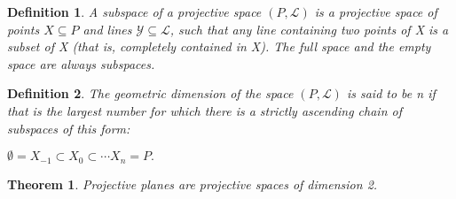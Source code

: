 \documentclass[12pt]{article}
\newtheorem{theorem}{Theorem}
\newtheorem{definition}{Definition}
\begin{document}
    \begin{definition}
        A subspace of a projective space $(P, \mathcal{L})$ is a projective space of points $X \subseteq P$ and lines $\mathcal{Y} \subseteq \mathcal{L}$,
        such that any line containing two points of X is a subset of X (that is, completely contained in X).
        The full space and the empty space are always subspaces.
    \end{definition}

    \begin{definition}
        The geometric dimension of the space $(P, \mathcal{L})$ is said to be n if that is the largest number for which there is a strictly ascending chain of subspaces of this form:
        \begin{center}
            $\emptyset = X_{-1}\subset X_{0}\subset \cdots X_{n}=P.$
        \end{center}
    \end{definition}

    \begin{theorem}
        Projective planes are projective spaces of dimension 2.
    \end{theorem}
\end{document}
